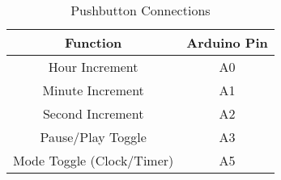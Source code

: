 \begin{table}[h]
    \centering
    \begin{tabular}{|c|c|}
        \hline
        \textbf{Function} & \textbf{Arduino Pin} \\
        \hline
        Hour Increment      & A0 \\
        Minute Increment    & A1 \\
        Second Increment    & A2 \\
        Pause/Play Toggle   & A3 \\
        Mode Toggle (Clock/Timer) & A5 \\
        \hline
    \end{tabular}
    \caption{Pushbutton Connections}
    \label{tab:buttons}
\end{table}

